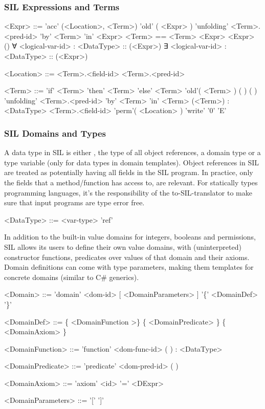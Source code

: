 \subsubsection{SIL Expressions and Terms}
\begin{grammar}
<Expr> ::= 'acc' (<Location>, <Term>)
	\alt 'old' ( <Expr> )
	\alt 'unfolding' <Term>.<pred-id> 'by' <Term> 'in' <Expr>
	\alt <Term> == <Term>
	\alt <unary-op> <Expr>
	\alt <binary-op> <Expr>
	\alt <dom-pred-id>()
	\alt ∀ <logical-var-id> : <DataType> :: (<Expr>)
	\alt ∃ <logical-var-id> : <DataType> :: (<Expr>)

<Location> ::= <Term>.<field-id>
	\alt <Term>.<pred-id>
\end{grammar}

\begin{grammar}
<Term> ::= 'if' <Term> 'then' <Term> 'else' <Term>
	\alt <var-id>
	\alt <logical-var-id>
	\alt 'old'( <Term> )
	\alt <func-id>(  )
	\alt <dom-func-id>(  )
	\alt 'unfolding' <Term>.<pred-id> 'by' <Term> 'in' <Term>
	\alt (<Term>) : <DataType>
	\alt <Term>.<field-id>
	\alt 'perm'( <Location> )
	\alt 'write'
	\alt '0'
	\alt  'E'
	\alt <integer-literal>
\end{grammar}

\subsubsection{SIL Domains and Types}
A data type in SIL is either , the type of all object references, a domain type or a type variable (only for data types in domain templates).
Object references in SIL are treated as potentially having all fields in the SIL program. In practice, only the fields that a method/function has access to, are relevant.
For statically types programming languages, it's the responsibility of the to-SIL-translator to make sure that input programs are type error free.
\begin{grammar}
<DataType> 
	::=  <var-type>
	\alt <dom-type>
	\alt 'ref'
\end{grammar}

In addition to the built-in value domains for integers, booleans and permissions, SIL allows its users to define their own value domains, with (uninterpreted) constructor functions, predicates over values of that domain and their axioms. Domain definitions can come with type parameters, making them templates for concrete domains (similar to C\# generics).
\begin{grammar}
<Domain> ::= 'domain' <dom-id> [ <DomainParameters> ] '\{' <DomainDef> '\}'

<DomainDef> ::= \{ <DomainFunction >\} \{ <DomainPredicate> \} \{ <DomainAxiom> \}

<DomainFunction> ::= 'function' <dom-func-id> (  ) : <DataType>

<DomainPredicate> ::= 'predicate' <dom-pred-id> (  )

<DomainAxiom> ::= 'axiom' <id> '=' <DExpr>

<DomainParameters> ::= '['  ']'
\end{grammar}

